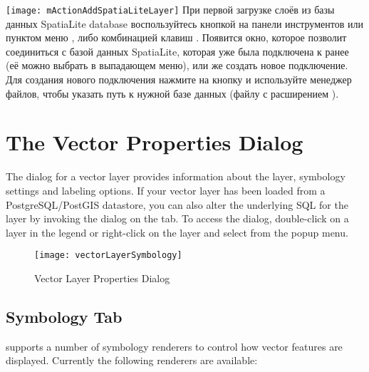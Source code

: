 \texttt{[image: mActionAddSpatiaLiteLayer]}
При первой загрузке слоёв из базы данных SpatiaLite database воспользуйтесь
кнопкой  на панели инструментов или
пунктом 
меню , либо комбинацией клавиш .
Появится окно, которое позволит соединиться с базой данных SpatiaLite, которая уже была подключена к \qg ранее
(её можно выбрать в выпадающем меню), или же создать новое подключение. Для создания нового подключения
нажмите на кнопку  и используйте менеджер файлов, чтобы указать путь к нужной базе данных
(файлу с расширением ).

\section{The Vector Properties Dialog}\label{sec:vectorprops}

The  dialog for a vector layer provides information
about the layer, symbology settings and labeling options. If your vector
layer has been loaded from a PostgreSQL/PostGIS datastore, you can also alter
the underlying SQL for the layer by invoking the 
dialog on the  tab.
To access the  dialog, double-click on a layer in
the legend or right-click on the layer and select 
from the popup menu.

\begin{figure}[ht]
   \centering
   \texttt{[image: vectorLayerSymbology]}
   \caption{Vector Layer Properties Dialog \nixcaption}\label{fig:vector_symbology}
 \end{figure}

\subsection{Symbology Tab}\label{sec:symbology}

\qg supports a number of symbology renderers to control how
vector features are displayed. Currently the following renderers
are available:


